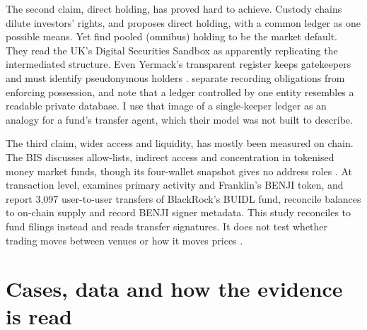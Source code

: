 \documentclass[12pt,a4paper]{article}
\begin{document}
The second claim, direct holding, has proved hard to achieve. Custody chains dilute investors' rights, and \citet[pp.~10, 37]{Micheler2015} proposes direct holding, with a common ledger as one possible means. Yet \citet[pp.~530, 545--546]{MichelerZaccaria2024} find pooled (omnibus) holding to be the market default. They read the UK's Digital Securities Sandbox as apparently replicating the intermediated structure. Even Yermack's transparent register keeps gatekeepers and must identify pseudonymous holders \citep[pp.~3, 5, 15--16]{Yermack2017}. \citet[pp.~4, 10, 44--46]{AbadiBrunnermeier2018} separate recording obligations from enforcing possession, and note that a ledger controlled by one entity resembles a readable private database. I use that image of a single-keeper ledger as an analogy for a fund's transfer agent, which their model was not built to describe.

The third claim, wider access and liquidity, has mostly been measured on chain. The BIS discusses allow-lists, indirect access and concentration in tokenised money market funds, though its four-wallet snapshot gives no address roles \citep[pp.~2--3, 5--6]{Aquilina2025BIS115}. At transaction level, \citet[pp.~3--5]{Luo2025} examines primary activity and Franklin's BENJI token, and \citet[pp.~13, 44]{LinPrasadRabettiZhang2026} report 3,097 user-to-user transfers of BlackRock's BUIDL fund, reconcile balances to on-chain supply and record BENJI signer metadata. This study reconciles to fund filings instead and reads transfer signatures. It does not test whether trading moves between venues \citep[p.~15]{CongMayerRabetti2026} or how it moves prices \citep{ChenDuffie2021}.

\section{Cases, data and how the evidence is read}\label{sec:method}
\end{document}
